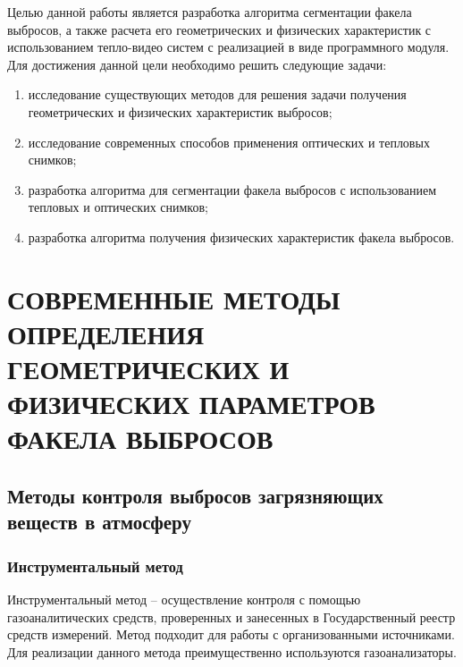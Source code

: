 \documentclass[14pt, a4paper]{extreport}
\begin{document}
		Целью данной работы является разработка алгоритма сегментации факела выбросов, а также расчета его геометрических и физических характеристик с использованием тепло-видео систем с реализацией в виде программного модуля. Для достижения данной цели необходимо решить следующие задачи:
	\begin{enumerate}[label={\arabic*)}]
		\item исследование существующих методов для решения задачи получения геометрических и физических характеристик выбросов;
		\item исследование современных способов применения оптических и тепловых снимков;
		\item разработка алгоритма для сегментации факела выбросов с использованием тепловых и оптических снимков;
		\item разработка алгоритма получения физических характеристик факела выбросов.
	\end{enumerate}

\chapter [\vspace*{-0.22cm}СОВРЕМЕННЫЕ МЕТОДЫ ОПРЕДЕЛЕНИЯ ГЕОМЕТРИЧЕСКИХ \hspace*{-0.5cm} И ФИЗИЧЕСКИХ ПАРАМЕТРОВ ФАКЕЛА ВЫБРОСОВ]{СОВРЕМЕННЫЕ МЕТОДЫ ОПРЕДЕЛЕНИЯ ГЕОМЕТРИЧЕСКИХ И ФИЗИЧЕСКИХ ПАРАМЕТРОВ ФАКЕЛА ВЫБРОСОВ}
\section {Методы контроля выбросов загрязняющих веществ в атмосферу}
\subsection {Инструментальный метод}
	Инструментальный метод -- осуществление контроля с помощью газоаналитических средств, проверенных и занесенных в Государственный реестр средств измерений. Метод подходит для работы с организованными источниками. Для реализации данного метода преимущественно используются газоанализаторы.
	
\end{document}
